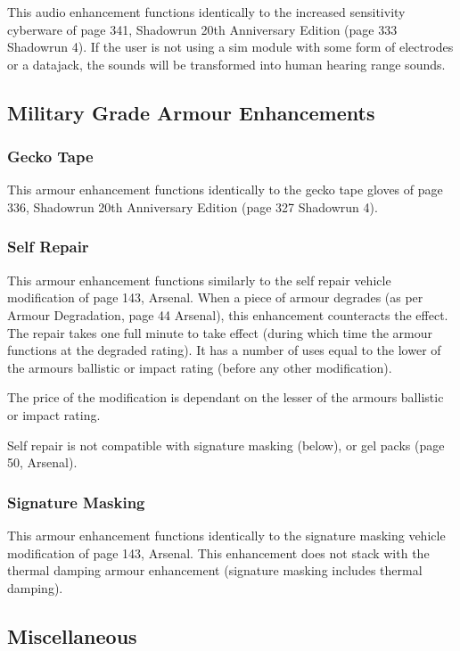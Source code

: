 \documentclass{article}
\begin{document}
This audio enhancement functions identically to the increased sensitivity cyberware of page 341, Shadowrun 20th Anniversary Edition (page 333 Shadowrun 4).  If the user is not using a sim module with some form of electrodes or a datajack, the sounds will be transformed into human hearing range sounds.

\subsection*{Military Grade Armour Enhancements}

\subsubsection*{Gecko Tape}

This armour enhancement functions identically to the gecko tape gloves of page 336, Shadowrun 20th Anniversary Edition (page 327 Shadowrun 4).

\subsubsection*{Self Repair}

This armour enhancement functions similarly to the self repair vehicle modification of page 143, Arsenal.  When a piece of armour degrades (as per Armour Degradation, page 44 Arsenal), this enhancement counteracts the effect.  The repair takes one full minute to take effect (during which time the armour functions at the degraded rating).  It has a number of uses equal to the lower of the armours ballistic or impact rating (before any other modification).

The price of the modification is dependant on the lesser of the armours ballistic or impact rating.

Self repair is not compatible with signature masking (below), or gel packs (page 50, Arsenal).

\subsubsection*{Signature Masking}

This armour enhancement functions identically to the signature masking vehicle modification of page 143, Arsenal.  This enhancement does not stack with the thermal damping armour enhancement (signature masking includes thermal damping).

\subsection*{Miscellaneous}
\end{document}
